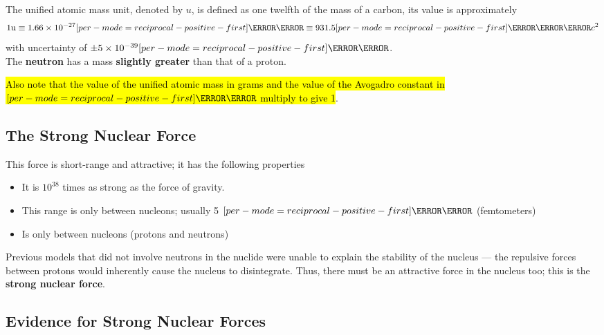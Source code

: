 \documentclass[a4paper,12pt]{article}
\let\oldsi\si
\renewcommand{\si}[1]{\oldsi[per-mode=reciprocal-positive-first]{#1}}
\newcommand{\lb}{\\[8pt]}
\begin{document}
The unified atomic mass unit, denoted by $u$, is defined as one twelfth of the mass of a carbon, its value is approximately $$1\mathrm{u} \equiv 1.66 \times 10^{-27} \si{\kilo\gram} \equiv 931.5 \si{\mega\electronvolt\per c^2}$$
with uncertainty of $\pm 5\times 10^{-39} \si{\kilo\gram}$.\lb
The \textbf{neutron} has a mass \textbf{slightly greater} than that of a proton.

\hl{Also note that the value of the unified atomic mass in grams and the value of the Avogadro constant in $\si{\per\mol}$ multiply to give 1}.

\subsection{The Strong Nuclear Force}

This force is short-range and attractive; it has the following properties
\begin{itemize}
  \item It is $10^{38}$ times as strong as the force of gravity.
  \item This range is only between nucleons; usually 5 $\si{\femto\m}$ (femtometers)
  \item Is only between nucleons (protons and neutrons)
\end{itemize}

Previous models that did not involve neutrons in the nuclide were unable to explain the stability of the nucleus --- the repulsive forces between protons would inherently cause the nucleus to disintegrate. Thus, there must be an attractive force in the nucleus too; this is the \textbf{strong nuclear force}.

\subsection{Evidence for Strong Nuclear Forces}
\end{document}
